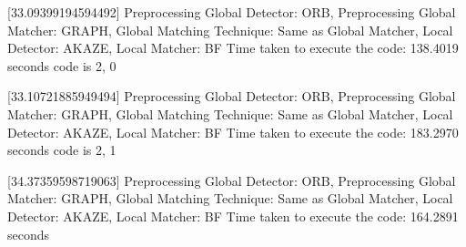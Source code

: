 [33.09399194594492]
Preprocessing Global Detector: ORB, Preprocessing Global Matcher: GRAPH, Global Matching Technique: Same as Global Matcher, Local Detector: AKAZE, Local Matcher: BF
Time taken to execute the code: 138.4019 seconds
code is 2, 0


[33.10721885949494]
Preprocessing Global Detector: ORB, Preprocessing Global Matcher: GRAPH, Global Matching Technique: Same as Global Matcher, Local Detector: AKAZE, Local Matcher: BF
Time taken to execute the code: 183.2970 seconds
code is 2, 1


[34.37359598719063]
Preprocessing Global Detector: ORB, Preprocessing Global Matcher: GRAPH, Global Matching Technique: Same as Global Matcher, Local Detector: AKAZE, Local Matcher: BF
Time taken to execute the code: 164.2891 seconds